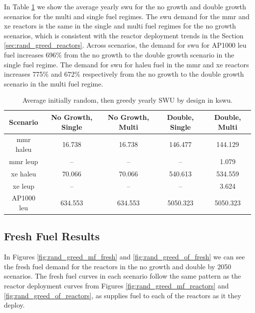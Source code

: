 
In Table \ref{tab:rand_greed_swu_avg} we show the average yearly \gls{swu} for the no growth and double growth scenarios for the multi and single fuel regimes. The \gls{swu} demand for the \gls{mmr} and \gls{xe} reactors is the same in the single and multi fuel regimes for the no growth scenarios, which is consistent with the reactor deployment trends in the Section \ref{sec:rand_greed_reactors}. Across scenarios, the demand for \gls{swu} for AP1000 \gls{leu} fuel increases 696\% from the no growth to the double growth scenario in the single fuel regime. The demand for \gls{swu} for \gls{haleu} fuel in the \gls{mmr} and \gls{xe} reactors increases 775\% and 672\% respectively from the no growth to the double growth scenario in the multi fuel regime.

\begin{table}[H]
    \centering
    \caption{Average initially random, then greedy yearly SWU by design in k\gls{swu}.}
    \label{tab:rand_greed_swu_avg}
    \begin{tabular}{c c c c c}
       \hline
       Scenario & No Growth, Single & No Growth, Multi & Double, Single & Double, Multi  \\
       \hline
       \gls{mmr} \gls{haleu}   & 16.738  & 16.738  & 146.477  & 144.129  \\
       \gls{mmr} \gls{leup}    & --      & --      & --       & 1.079    \\
       \gls{xe} \gls{haleu}    & 70.066  & 70.066  & 540.613  & 534.559  \\
       \gls{xe} \gls{leup}     & --      & --      & --       & 3.624    \\
       AP1000 \gls{leu}        & 634.553 & 634.553 & 5050.323 & 5050.323 \\
       \hline
    \end{tabular}
\end{table}



\subsection{Fresh Fuel Results}
\label{sec:rand_greed_fresh}

In Figures \ref{fig:rand_greed_mf_fresh} and \ref{fig:rand_greed_of_fresh} we can see the fresh fuel demand for the reactors in the no growth and double by 2050 scenarios. The fresh fuel curves in each scenario follow the same pattern as the reactor deployment curves from Figures \ref{fig:rand_greed_mf_reactors} and \ref{fig:rand_greed_of_reactors}, as \cyclus supplies fuel to each of the reactors as it they deploy.


